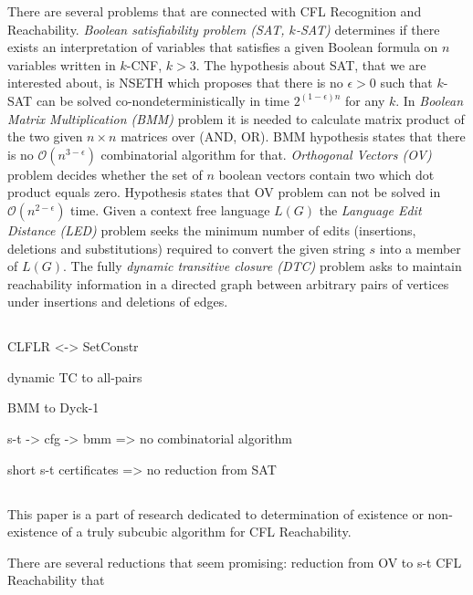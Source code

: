 \documentclass[acmsmall,review,nonacm]{acmart}\settopmatter{printfolios=true,printccs=false,printacmref=false}
\begin{document}
	There are several problems that are connected with CFL Recognition and Reachability. 
	\emph{Boolean satisfiability problem (SAT, $k$-SAT)} determines if there exists an interpretation of variables that satisfies a given Boolean formula on $n$ variables written in $k$-CNF, $k > 3$. The hypothesis about SAT, that we are interested about, is NSETH which proposes that there is no $\epsilon > 0$ such that $k$-SAT can be solved co-nondeterministically in time $2^{(1 - \epsilon) n}$ for any $k$.
	In \emph{Boolean Matrix Multiplication (BMM)} problem it is needed to calculate matrix product of the two given $n \times n$ matrices over (AND, OR). BMM hypothesis states that there is no $\mathcal{O}(n^{3 - \epsilon})$ combinatorial algorithm for that. 
	\emph{Orthogonal Vectors (OV)} problem decides whether the set of $n$ boolean vectors contain two which dot product equals zero. Hypothesis states that OV problem can not be solved in $\mathcal{O}(n^{2 - \epsilon})$ time. 
	Given a context free language $L(G)$ the \emph{Language Edit Distance (LED)} problem seeks the minimum number of edits (insertions, deletions and substitutions) required to convert the given string $s$ into a member of $L(G)$. The fully \emph{dynamic transitive closure (DTC)} problem asks to maintain reachability information in a directed graph between arbitrary pairs of vertices under insertions and deletions of edges.
	
	\subsection{}
	
	CLFLR <-> SetConstr
		
	dynamic TC to all-pairs
	
	BMM to Dyck-1
	
	s-t -> cfg -> bmm => no combinatorial algorithm
	
	short s-t certificates => no reduction from SAT
		
	\subsection{}
	
	This paper is a part of research dedicated to determination of existence or non-existence of a truly subcubic algorithm for CFL Reachability. 
	
	
	There are several reductions that seem promising: reduction from OV to s-t CFL Reachability that 
	
\end{document}
